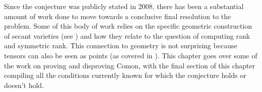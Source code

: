 \documentclass[../Lael_John_MasterThesis_Draft.tex]{subfiles}
\begin{document}
Since the conjecture was publicly stated in 2008, there has been a substantial amount of work done to move towards a conclusive final resolution to the problem. Some of this body of work relies on the specific geometric construction of secant varieties (see ) and how they relate to the question of computing rank and symmetric rank. This connection to geometry is not surprising because tensors can also be seen as points (as covered in ). This chapter goes over some of the work on proving and disproving Comon, with the final section of this chapter compiling all the conditions currently known for which the conjecture holds or doesn't hold.

% 
% 
\end{document}

